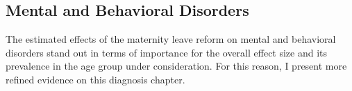 \documentclass[11pt, a4paper]{article} %
\begin{document}
\subsection{Mental and Behavioral Disorders}
The estimated effects of the maternity leave reform on mental and behavioral disorders stand out in terms of importance for the overall effect size and its prevalence in the age group under consideration. For this reason, I present more refined evidence on this diagnosis chapter. %
\end{document}

